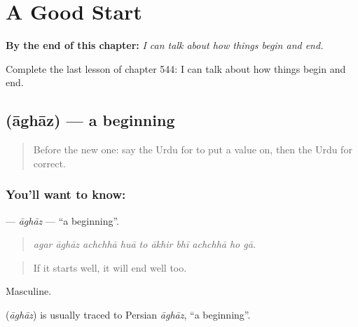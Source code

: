 
\chapter{A Good Start}
\label{ch:ur-a-good-start}

\begin{chapteropening}
\textbf{By the end of this chapter:} \emph{I can talk about how things begin and end.}

Complete the last lesson of chapter 544: I can talk about how things begin and end.
\end{chapteropening}

\section[\texorpdfstring{\ur{آغاز} (āghāz)}{آغاز (āghāz)}]{ (āghāz) — a beginning}

\label{lesson:UR-C544-aghaz}



\begin{quote}
Before the new one: say the Urdu for to put a value on, then the Urdu for correct.
\end{quote}

\subsection*{You'll want to know: }
\textbf{} — \emph{āghāz} — \textquotedblleft{}a beginning\textquotedblright{}.

\begin{quote}
         
\end{quote}

\begin{quote}
\emph{agar āghāz achchhā huā to ākhir bhī achchhā ho gā.}
\end{quote}

\begin{quote}
If it starts well, it will end well too.
\end{quote}

Masculine.

\begin{cousinweb}
\textbf{} (\emph{āghāz}) is usually traced to Persian \emph{āghāz}, \textquotedblleft{}a beginning\textquotedblright{}.
\end{cousinweb}

